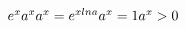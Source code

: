 
$
\vspace{5mm} e^{x} \\ \\
\vspace{5mm} a^{x} \\
\vspace{5mm} a^{x} = e^{xlna} \\
\vspace{5mm} a^{x} = 1 \\
\vspace{5mm} a^{x} > 0 \\


$
